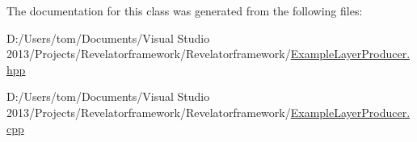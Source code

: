 The documentation for this class was generated from the following files\-:\begin{DoxyCompactItemize}
\item 
D\-:/\-Users/tom/\-Documents/\-Visual Studio 2013/\-Projects/\-Revelatorframework/\-Revelatorframework/\hyperlink{_example_layer_producer_8hpp}{Example\-Layer\-Producer.\-hpp}\item 
D\-:/\-Users/tom/\-Documents/\-Visual Studio 2013/\-Projects/\-Revelatorframework/\-Revelatorframework/\hyperlink{_example_layer_producer_8cpp}{Example\-Layer\-Producer.\-cpp}\end{DoxyCompactItemize}
